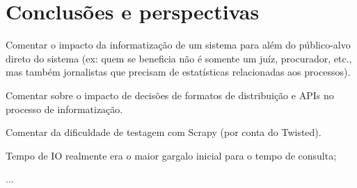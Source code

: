 \chapter{Conclusões e perspectivas~\label{chp:conclusions}}


\begin{todolist}
    \item Comentar o impacto da informatização de um sistema para além do
          público-alvo direto do sistema (ex: quem se beneficia não é somente
          um juíz, procurador, etc., mas também jornalistas que precisam de
          estatísticas relacionadas aos processos).
    \item Comentar sobre o impacto de decisões de formatos de distribuição e
          APIs no processo de informatização.
\end{todolist}

\begin{todolist}
    \item Comentar da dificuldade de testagem com Scrapy (por conta do Twisted).
\end{todolist}


\begin{todolist}
    \item Tempo de IO realmente era o maior gargalo inicial para o tempo de consulta;
    \item ...
\end{todolist}
